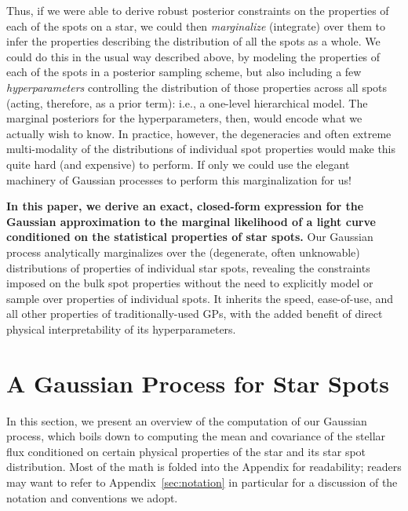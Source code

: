 \documentclass[modern]{aastex62}
\begin{document}
Thus, if we were able to derive robust posterior constraints
on the properties of each of the spots on a star, we could then
\emph{marginalize} (integrate) over them to infer the properties
describing the distribution of all the spots as a whole.
We could do this in the usual way described above, by
modeling the properties of each of the spots in a posterior sampling
scheme, but also including a few
\emph{hyperparameters} controlling the distribution of those properties
across all spots (acting, therefore, as a prior term): i.e., a one-level
hierarchical model. The marginal posteriors for the hyperparameters, then,
would encode what we actually wish to know.
%
In practice, however, the degeneracies and often extreme multi-modality
of the distributions of individual spot properties would make this
quite hard (and expensive) to perform.
%
If only we could use the elegant machinery of Gaussian processes to
perform this marginalization for us!

\textbf{In this paper, we derive an exact, closed-form expression for
    the Gaussian approximation to the marginal likelihood of a light curve
    conditioned on the statistical properties of star spots.} Our Gaussian
process analytically marginalizes over the (degenerate, often unknowable)
distributions of properties of individual star spots, revealing the
constraints imposed on the bulk spot properties without the need to
explicitly model or sample over properties of individual spots. It inherits
the speed, ease-of-use, and all other properties of traditionally-used
GPs, with the added benefit of direct physical interpretability of its
hyperparameters.
%


\section{A Gaussian Process for Star Spots}
\label{sec:main}

In this section, we present an overview of the computation of our Gaussian
process, which boils down to computing the mean and covariance of the stellar
flux conditioned on certain physical properties of the star and its star spot
distribution. Most of the math is folded into the Appendix for readability;
readers may want to refer to Appendix~\ref{sec:notation} in particular for
a discussion of the notation and conventions we adopt.
\end{document}
